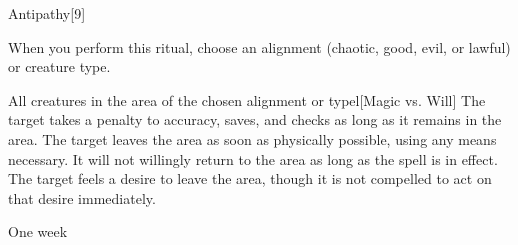 \begin{spellsection}{Antipathy}[9]
    \begin{spellheader}
    \end{spellheader}
    \begin{spellcontent}
        \begin{spelltargetinginfo}
        \end{spelltargetinginfo}
        \begin{spelleffects}

            \spellspecial When you perform this ritual, choose an alignment (chaotic, good, evil, or lawful) or creature type.
            \begin{spelltargets}{All creatures in the area of the chosen alignment or type}l[Magic vs. Will]
                \spelleffect The target takes a  penalty to accuracy, saves, and checks as long as it remains in the area.
                \spellsuccess The target leaves the area as soon as physically possible, using any means necessary. It will not willingly return to the area as long as the spell is in effect.
                \spellfailure The target feels a desire to leave the area, though it is not compelled to act on that desire immediately.
            \end{spelltargets}
            \spelldur One week \dismissable
        \end{spelleffects}
    \end{spellcontent}
    \begin{spellfooter}
    \end{spellfooter}
\end{spellsection}

